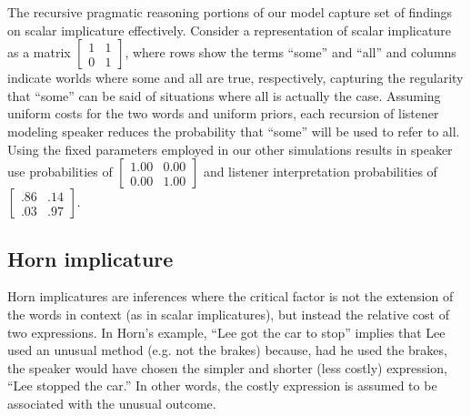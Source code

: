 \documentclass{article} %
\begin{document}
The recursive pragmatic reasoning portions of our model capture set of findings on scalar implicature effectively. Consider a representation of scalar implicature as a matrix 
$\left[
    \begin{array}{cc}
      1 & 1 \\
      0 & 1
    \end{array} 
  \right]$,
where rows show the terms ``some'' and ``all'' and columns indicate worlds where {\sc some} and {\sc all} are true, respectively, capturing the regularity that ``some'' can be said of situations where {\sc all} is actually the case. Assuming uniform costs for the two words and uniform priors, each recursion of listener modeling speaker reduces the probability that ``some'' will be used to refer to {\sc all}. Using the fixed parameters employed in our other simulations results in speaker use probabilities of 
$\left[
    \begin{array}{cc}
      1.00 & 0.00 \\
      0.00 & 1.00
    \end{array} 
  \right]$
and listener interpretation probabilities of 
$\left[
    \begin{array}{cc}
      .86 & .14 \\
      .03 & .97
    \end{array} 
  \right]$.

%
%

\subsection{Horn implicature}

Horn implicatures are inferences where the critical factor is not the extension of the words in context (as in scalar implicatures), but instead the relative cost of two expressions. In Horn's example, ``Lee got the car to stop'' implies that Lee used an unusual method (e.g. not the brakes) because, had he used the brakes, the speaker would have chosen the simpler and shorter (less costly) expression, ``Lee stopped the car.'' In other words, the costly expression is assumed to be associated with the unusual outcome.
\end{document}
